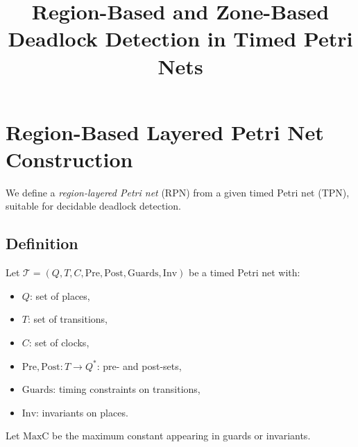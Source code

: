 \documentclass{article}
\title{Region-Based and Zone-Based Deadlock Detection in Timed Petri Nets}
\author{}
\date{}
\begin{document}
\maketitle

\section{Region-Based Layered Petri Net Construction}

We define a \emph{region-layered Petri net} (RPN) from a given timed Petri net (TPN), suitable for decidable deadlock detection.

\subsection*{Definition}
Let $\mathcal{T} = (Q, T, C, \text{Pre}, \text{Post}, \text{Guards}, \text{Inv})$ be a timed Petri net with:
\begin{itemize}[noitemsep]
  \item $Q$: set of places,
  \item $T$: set of transitions,
  \item $C$: set of clocks,
  \item $\text{Pre}, \text{Post}: T \to Q^*$: pre- and post-sets,
  \item $\text{Guards}$: timing constraints on transitions,
  \item $\text{Inv}$: invariants on places.
\end{itemize}

Let $\text{MaxC}$ be the maximum constant appearing in guards or invariants.
\end{document}
